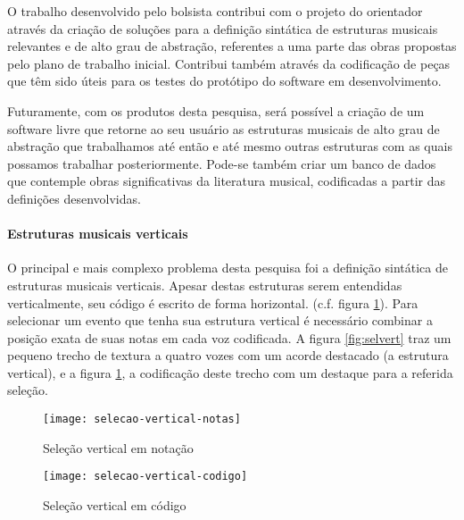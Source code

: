 \documentclass[11pt]{article}
\begin{document}

O trabalho desenvolvido pelo bolsista contribui com o projeto do
orientador através da criação de soluções para a definição sintática
de estruturas musicais relevantes e de alto grau de abstração,
referentes a uma parte das obras propostas pelo plano de trabalho
inicial. Contribui também através da codificação de peças que têm sido
úteis para os testes do protótipo do software em desenvolvimento.

Futuramente, com os produtos desta pesquisa, será possível a criação
de um software livre que retorne ao seu usuário as estruturas musicais
de alto grau de abstração que trabalhamos até então e até mesmo outras
estruturas com as quais possamos trabalhar posteriormente. Pode-se
também criar um banco de dados que contemple obras significativas da
literatura musical, codificadas a partir das definições desenvolvidas.


\paragraph{Estruturas musicais verticais}
\label{sec:estr-music-vert}

O principal e mais complexo problema desta pesquisa foi a definição
sintática de estruturas musicais verticais. Apesar destas estruturas
serem entendidas verticalmente, seu código é escrito de forma
horizontal.  (c.f. figura \ref{fig:codselvert}). Para selecionar um
evento que tenha sua estrutura vertical é necessário combinar a
posição exata de suas notas em cada voz codificada.  A figura
\ref{fig:selvert} traz um pequeno trecho de textura a quatro vozes com
um acorde destacado (a estrutura vertical), e a figura
\ref{fig:codselvert}, a codificação deste trecho com um destaque para
a referida seleção.

\begin{figure}
\begin{minipage}[t]{6.5cm}
  \centering
 \texttt{[image: selecao-vertical-notas]}
 \caption{Seleção vertical em notação}
 \label{fig:selvert}
\end{minipage}
\hfill
\begin{minipage}[t]{6.5cm}
  \centering
 \texttt{[image: selecao-vertical-codigo]}
 \caption{Seleção vertical em código}
 \label{fig:codselvert}
\end{minipage}
\hfill
\end{figure}
\end{document}
